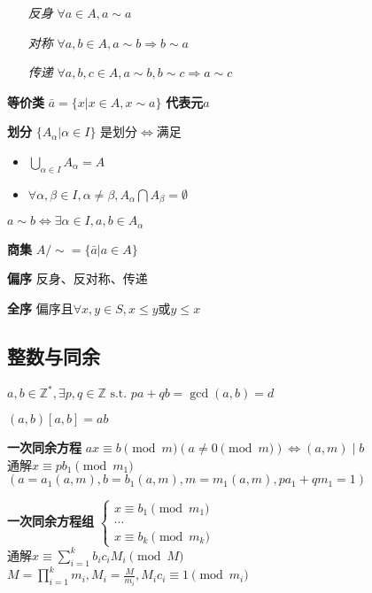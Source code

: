 \documentclass[a4paper,10pt]{ctexart}
\newcommand*{\setZ}{\mathbb{Z}}
\newcommand*{\st}{\text{ s.t. }}
\newcommand*{\impl}{\Rightarrow}
\renewcommand*{\iff}{\Leftrightarrow}
\renewcommand*{\leq}{\leqslant}
\begin{document}
\begin{multicols}{3}
    \begin{itemize}
        \item[\emph{反身}] $\forall a \!\in\! A, a \sim a$
        \item[\emph{对称}] $\forall a, b \!\in\! A, a \sim b \impl b \sim a$
        \item[\emph{传递}] $\forall a, b, c \!\in\! A, a \sim b, b \sim c \impl a \sim c $
    \end{itemize}

    \textbf{等价类} $\bar{a} = \{ x | x \in A, x \sim a \}$ \textbf{代表元}$a$

    \textbf{划分} $\{ A_\alpha | \alpha \in I \}$ 是划分$\iff$满足

    \begin{itemize}
        \item $\bigcup\limits_{\alpha \in I} A_\alpha = A$
        \item $\forall \alpha, \beta \in I, \alpha \ne \beta, A_\alpha \bigcap A_\beta = \emptyset$
    \end{itemize}

    \begin{theorem}[等价与划分]
        $a \sim b \iff \exists \alpha \in I, a, b \in A_\alpha$
    \end{theorem}

    \textbf{商集} $A/\sim = \{ \bar{a} | a \in A \}$

    \textbf{偏序} 反身、反对称、传递

    \textbf{全序} 偏序且$\forall x, y \in S, x \leq y$或$y \leq x$

    \subsection{整数与同余}

    \begin{theorem}[Bézout定理]
        $a, b \in \setZ^*, \exists p, q \in \setZ \st pa + qb = \gcd(a, b) = d$
    \end{theorem}

    \begin{theorem}
        $(a, b)[a, b] = ab$
    \end{theorem}

    \textbf{一次同余方程} $ax \equiv b \pmod{m} (a \ne 0 \pmod{m}) \iff (a, m) \mid b$\\
    通解$x \equiv pb_1 \pmod{m_1}$ $(a = a_1(a, m), b = b_1(a, m), m = m_1(a, m), pa_1 +qm_1 = 1)$

    \textbf{一次同余方程组} $\begin{cases}
            x \equiv b_1 \pmod{m_1} \\
            \cdots                  \\
            x \equiv b_k \pmod{m_k}
        \end{cases}$\\
    通解$x \equiv \sum_{i=1}^k b_i c_i M_i \pmod{M}$\\
    $M \! = \! \prod\limits_{i=1}^k m_i, M_i \! = \! \frac{M}{m_i}, M_i c_i \equiv 1 \pmod{m_i}$


\end{multicols}
\end{document}
